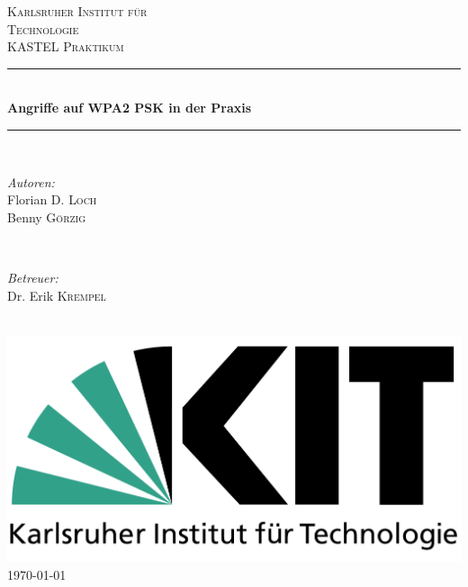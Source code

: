 \begin{titlepage}

\newcommand{\HRule}{\rule{\linewidth}{0.5mm}}

\center

\textsc{\LARGE Karlsruher Institut für }\\[0.5cm]
\textsc{\LARGE Technologie} \\[1.5cm]
\textsc{\Large KASTEL Praktikum}\\[0.5cm]

\HRule \\[0.4cm]
{ \huge \bfseries Angriffe auf WPA2 PSK in der Praxis}\\[0.4cm] %
\HRule \\[1.5cm]
 

\begin{minipage}{0.4\textwidth}
\begin{flushleft} \large
\emph{Autoren:}\\
Florian D. \textsc{Loch} \\
Benny \textsc{Görzig}
\end{flushleft}
\end{minipage}
~
\begin{minipage}{0.4\textwidth}
\begin{flushright} \large
\emph{Betreuer:} \\
Dr. Erik \textsc{Krempel}
\end{flushright}
\end{minipage}\\[2cm]

\includegraphics{logo}\\[1cm] 

{\large \today}\\[1cm]

\vfill 

\end{titlepage}